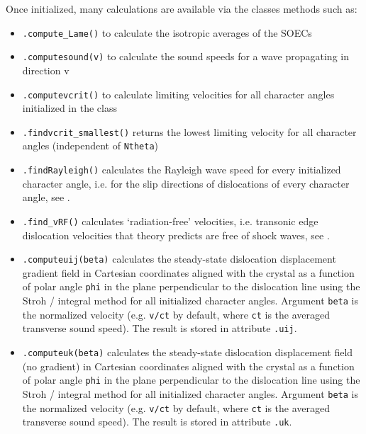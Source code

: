 \documentclass[11pt,letterpaper,oneside,pdftex]{article}
\begin{document}
Once initialized, many calculations are available via the classes methods such as:
\begin{itemize}
\item \verb|.compute_Lame()| to calculate the isotropic averages of the SOECs

\item \verb|.computesound(v)| to calculate the sound speeds for a wave propagating in direction v

\item \verb|.computevcrit()| to calculate limiting velocities for all character angles initialized in the class

\item \verb|.findvcrit_smallest()| returns the lowest limiting velocity for all character angles (independent of \verb|Ntheta|)

\item \verb|.findRayleigh()| calculates the Rayleigh wave speed for every initialized character angle, i.e. for the slip directions of dislocations of every character angle, see \cite{Barnett:1973b}.

\item \verb|.find_vRF()| calculates `radiation-free' velocities, i.e. transonic edge dislocation velocities that theory predicts are free of shock waves, see \cite{Gao:1999,Blaschke:2023rad}.

\item \verb|.computeuij(beta)| calculates the steady-state dislocation displacement gradient field in Cartesian coordinates aligned with the crystal as a function of polar angle \verb|phi| in the plane perpendicular to the dislocation line using the Stroh / integral method \cite{Bacon:1980} for all initialized character angles.
Argument \verb|beta| is the normalized velocity (e.g. \verb|v/ct| by default, where \verb|ct| is the averaged transverse sound speed).
The result is stored in attribute \verb|.uij|.

\item \verb|.computeuk(beta)| calculates the steady-state dislocation displacement field (no gradient) in Cartesian coordinates aligned with the crystal as a function of polar angle \verb|phi| in the plane perpendicular to the dislocation line using the Stroh / integral method \cite{Bacon:1980} for all initialized character angles.
Argument \verb|beta| is the normalized velocity (e.g. \verb|v/ct| by default, where \verb|ct| is the averaged transverse sound speed).
The result is stored in attribute \verb|.uk|.


\end{itemize}
\end{document}
